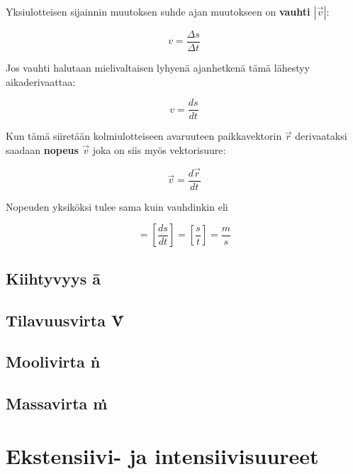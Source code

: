 \documentclass[12pt,a4paper,finnish]{book}
\begin{document}
Yksiulotteisen sijainnin muutoksen suhde ajan muutokseen on \textbf{vauhti $|\vec{v}|$}:

\begin{equation}
 v = \frac{\Delta s}{\Delta t}
\end{equation}

Jos vauhti halutaan mielivaltaisen lyhyenä ajanhetkenä tämä lähestyy aikaderivaattaa:

\begin{equation}
 v = \frac{ds}{dt}
\end{equation}

Kun tämä siiretään kolmiulotteiseen avaruuteen paikkavektorin $\vec{r}$ derivaataksi saadaan \textbf{nopeus $\vec{v}$} 
joka on siis myös vektorisuure:

\begin{equation}
 \vec{v} = \frac{d\vec{r}}{dt}
\end{equation}

Nopeuden yksiköksi tulee sama kuin vauhdinkin eli

\begin{equation}
 [v] = \left[\frac{ds}{dt}\right] = \left[\frac{s}{t}\right] = \frac{m}{s}
\end{equation}


\subsection{Kiihtyvyys \={a}}

\subsection{Tilavuusvirta \.{V}}

\subsection{Moolivirta \.{n}}

\subsection{Massavirta \.{m}}

\section{Ekstensiivi- ja intensiivisuureet} %
\end{document}
